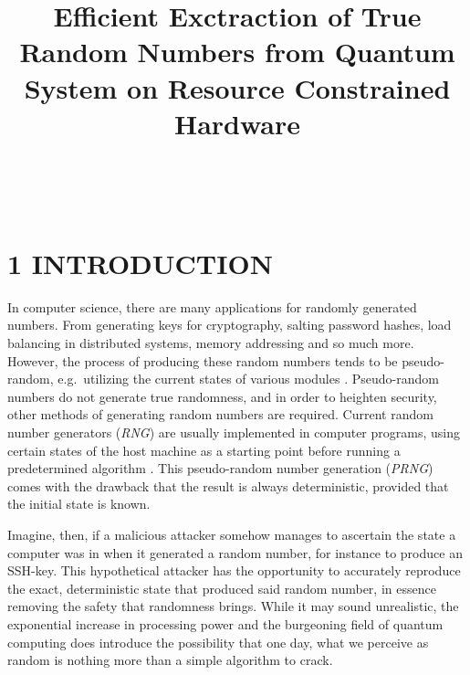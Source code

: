 \documentclass{sigchi}
\def\plaintitle{Efficient Exctraction of True Random Numbers from Quantum System on Resource Constrained Hardware}
\begin{document}
\title{\plaintitle}

\author{%
	\\
	\\
}

\maketitle


\section{1 INTRODUCTION}\label{introduction}

In computer science, there are many applications for randomly generated numbers. From generating keys for cryptography, salting password hashes, load balancing in distributed systems, memory addressing and so much more. However, the process of producing these random numbers tends to be pseudo-random, e.g.~utilizing the current states of various modules \cite{randomness}. Pseudo-random numbers do not generate true randomness, and in order to heighten security, other methods of generating random numbers are required. Current random number generators (\emph{RNG}) are usually implemented in computer programs, using certain states of the host machine as a starting point before running a predetermined algorithm \cite{randomness}. This pseudo-random number generation (\emph{PRNG}) comes with the drawback that the result is always deterministic, provided that the initial state is known.

Imagine, then, if a malicious attacker somehow manages to ascertain the state a computer was in when it generated a random number, for instance to produce an SSH-key. This hypothetical attacker has the opportunity to accurately reproduce the exact, deterministic state that produced said random number, in essence removing the safety that randomness brings. While it may sound unrealistic, the exponential increase in processing power and the burgeoning field of quantum computing does introduce the possibility that one day, what we perceive as random is nothing more than a simple algorithm to crack.
\end{document}

